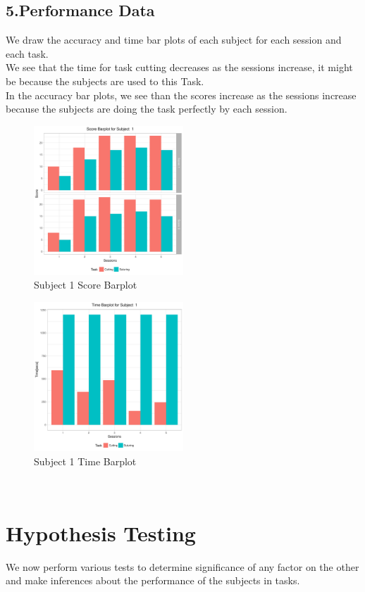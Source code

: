\documentclass[12pt,epsf]{report}
\begin{document}
{\subsection*{5.Performance Data}
We draw the accuracy and time bar plots of each subject for each session and each task.\\
We see that the time for task cutting decreases as the sessions increase, it might be because the subjects are used to this Task. \\
In the accuracy bar plots, we see than the scores increase as the sessions increase because the subjects are doing the task perfectly by each session.
\begin{figure}[!htb]
	\centering
	\includegraphics[width=0.5\textwidth]{1_Score_barplot.pdf}
	\caption{Subject 1 Score Barplot}
	\centering
\end{figure}
\begin{figure}[!htb]
	\centering
	\includegraphics[width=0.5\textwidth]{1_Time_barplot.pdf}
	\caption{Subject 1 Time Barplot}
	\centering
\end{figure}\\
\section*{Hypothesis Testing}
We now perform various tests to determine significance of any factor on the other and make inferences about the performance of the subjects in tasks.\\
}
\end{document}
